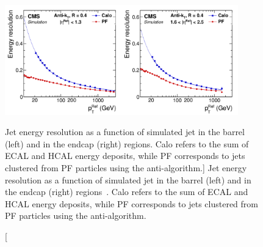 \begin{figure}
  \centering
   \includegraphics[width=0.9\textwidth]{fig/experiment/reconstruction/jet_energy_resolution.png}
	\caption
	[Jet energy resolution as a function of simulated jet \pt in the barrel (left) and in the endcap (right) regions. Calo refers to the sum of ECAL and HCAL energy deposits, 
	while PF corresponds to jets clustered from PF particles using the anti-\kt algorithm.]
	{Jet energy resolution as a function of simulated jet \pt in the barrel (left) and in the endcap (right) regions~\cite{CMS:2017yfk}. Calo refers to the sum of ECAL and HCAL energy deposits, 
	while PF corresponds to jets clustered from PF particles using the anti-\kt algorithm.}
	\label{fig:jet_resolution}
\end{figure}

